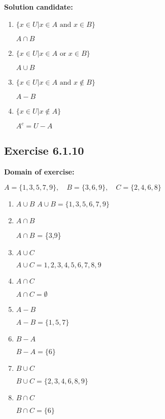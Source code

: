 \documentclass{report}
\newcommand{\cent}[1]{\begin{center}#1\end{center}}
\newcommand{\In}{\! \in \!}
\newcommand{\Domain}{\textbf{Domain of exercise: }}
\newcommand{\solution}{\textbf{Solution candidate: }}
\newcommand{\Exercise}[1]{\subsection{Exercise #1}}
\newcommand{\defaultEnumerateLabel}{\textbf{\alph*.}}
\begin{document}
	\solution
	\begin{enumerate}[label=\defaultEnumerateLabel]
		\item $\{x \in U | x \In A \text{ and } x \In B\}$
		
		\cent{$A \cap B$}
		
		\item $\{x \In U | x \In A \text{ or } x \In B\}$
		
		\cent{$A \cup B$}
		
		\item $\{x \In U | x \In A \text{ and } x \notin B \}$
		
		\cent{$A - B$}
		
		\item $\{x \In U | x \notin A \}$
		
		\cent{$A^c = U - A$}
		
		\end{enumerate}
		
		\Exercise{6.1.10}
		
		\Domain
		\cent{$A = \{1,3,5,7,9\}, \quad B = \{3,6,9\}, \quad C = \{2,4,6,8\}$}
				
		
		\begin{enumerate}[label = \defaultEnumerateLabel]
			\item $A \cup B$
			$A \cup B = \{1,3,5,6,7,9\}$
			
			\item $A \cap B$
			
			$A \cap B$ = \{3,9\}
			
			\item $A \cup C$
			
			\cent{$A \cup C = 1,2,3,4,5,6,7,8,9$}
			
			\item $A \cap C$
			
			\cent{$A \cap C = \emptyset$}
			
			\item $A-B$
			
			\cent{$A-B = \{1,5,7\}$}
			
			\item $B-A$
			
			\cent{$B - A = \{6\}$}
			
			\item $B \cup C$
			
			\cent{$B \cup C = \{2,3,4,6,8,9\}$}
			
			\item $B \cap C$
			
			\cent{$B \cap C = \{6\}$}
		\end{enumerate}
		
\end{document}
